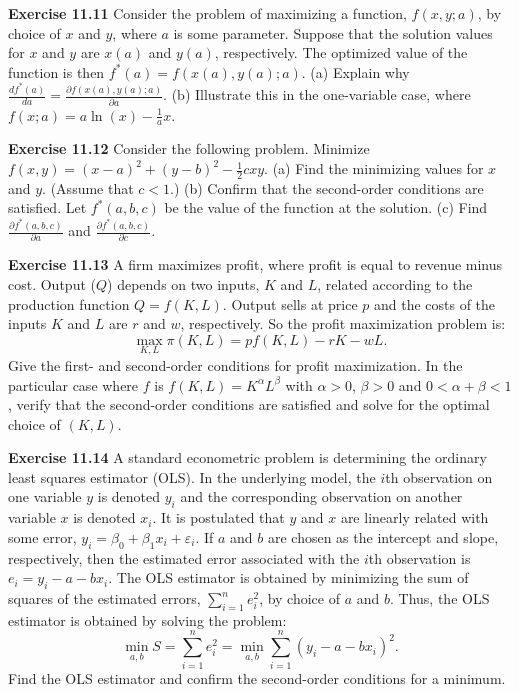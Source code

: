 \begin{original}
\textbf{Exercise 11.11} Consider the problem of maximizing a function, $f(x, y; a)$, by choice of $x$ and $y$, where $a$ is some parameter. Suppose that the solution values for $x$ and $y$ are $x(a)$ and $y(a)$, respectively. The optimized value of the function is then $f^*(a) = f(x(a), y(a); a)$.
(a) Explain why $\frac{df^*(a)}{da} = \frac{\partial f(x(a), y(a); a)}{\partial a}$.
(b) Illustrate this in the one-variable case, where $f(x; a) = a\ln(x) - \frac{1}{a}x$.

\textbf{Exercise 11.12} Consider the following problem. Minimize $f(x, y) = (x - a)^2 + (y - b)^2 - \frac{1}{2}cxy$.
(a) Find the minimizing values for $x$ and $y$. (Assume that $c < 1$.)
(b) Confirm that the second-order conditions are satisfied. Let $f^*(a, b, c)$ be the value of the function at the solution.
(c) Find $\frac{\partial f^*(a,b,c)}{\partial a}$ and $\frac{\partial f^*(a,b,c)}{\partial c}$.

\textbf{Exercise 11.13} A firm maximizes profit, where profit is equal to revenue minus cost. Output ($Q$) depends on two inputs, $K$ and $L$, related according to the production function $Q = f(K, L)$. Output sells at price $p$ and the costs of the inputs $K$ and $L$ are $r$ and $w$, respectively. So the profit maximization problem is:
\[
\max_{K,L} \pi(K, L) = p f(K, L) - rK - wL.
\]
Give the first- and second-order conditions for profit maximization. In the particular case where $f$ is $f(K, L) = K^\alpha L^\beta$ with $\alpha > 0$, $\beta > 0$ and $0 < \alpha + \beta < 1$, verify that the second-order conditions are satisfied and solve for the optimal choice of $(K, L)$.

\textbf{Exercise 11.14} A standard econometric problem is determining the ordinary least squares estimator (OLS). In the underlying model, the $i$th observation on one variable $y$ is denoted $y_i$ and the corresponding observation on another variable $x$ is denoted $x_i$. It is postulated that $y$ and $x$ are linearly related with some error, $y_i = \beta_0 + \beta_1 x_i + \varepsilon_i$. If $a$ and $b$ are chosen as the intercept and slope, respectively, then the estimated error associated with the $i$th observation is $e_i = y_i - a - b x_i$. The OLS estimator is obtained by minimizing the sum of squares of the estimated errors, $\sum_{i=1}^n e_i^2$, by choice of $a$ and $b$. Thus, the OLS estimator is obtained by solving the problem:
\[
\min_{a,b} S = \sum_{i=1}^n e_i^2 = \min_{a,b} \sum_{i=1}^n (y_i - a - b x_i)^2.
\]
Find the OLS estimator and confirm the second-order conditions for a minimum.


\end{original}
